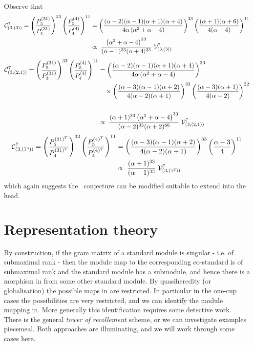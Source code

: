 \documentclass{article}
\newcommand{\ppmm}[1]{#1}  %
\theoremstyle{definition}
\def\a{\alpha}
\numberwithin{equation}{subsection}
\begin{document}
Observe that
\begin{align*}
\CC^{7}_{(3,(3))} = 
\left( \frac{ P^{(31)}_{\ppmm{5}}}{P^{(31)}_{4}} \right)^{33} 
\left( \frac{ P^{(4)}_{\ppmm{5}}}{P^{(4)}_{4}} \right)^{11} 
&=  \left( \frac{(\alpha -2) (\alpha -1) (\alpha +1) (\alpha +4)}{4 \alpha  \left(\alpha ^2+\alpha -4\right)}  \right)^{33} 
\left( \frac{(\alpha +1) (\alpha +6)}{4 (\alpha +4)}\right)^{11} 
\\
&\propto \; \frac{\left(\alpha ^2+\alpha -4\right)^{33}}{(\alpha -1)^{33} (\alpha +4)^{33}} \; \V^7_{(3,(3))}
\end{align*}
\begin{align*}
\CC^{7}_{(3,(2,1))} = 
\left( \frac{ P^{(31)}_{\ppmm{5}}}{P^{(31)}_{3}} \right)^{33} 
\left( \frac{ P^{(4)}_{\ppmm{5}}}{P^{(4)}_{4}} \right)^{11} 
&= \left( \frac{(\alpha -2) (\alpha -1) (\alpha +1) (\alpha +4)}{4 \alpha  \left(\alpha ^2+\alpha -4\right)}  \right)^{33}\\
&\quad \times \left(\frac{(\alpha -3) (\alpha -1) (\alpha +2)}{4 (\alpha -2) (\alpha +1)}\right)^{33}\left(\frac{(\alpha -3) (\alpha +1)}{4 (\alpha -2)}\right)^{22}\\ 
\\
&\propto \; \frac{ (\alpha +1)^{33} \left(\alpha ^2+\alpha -4\right)^{33}}{(\alpha -2)^{33} (\alpha +2)^{66}} \; \V^7_{(3,(2,1))}
\end{align*}
\begin{align*}
\CC^{7}_{(3,(1^3))} = 
\left( \frac{ P^{(31)^T}_{\ppmm{5}}}{P^{(31)^T}_{4}} \right)^{33} 
\left( \frac{ P^{(4)^T}_{\ppmm{5}}}{P^{(4)^T}_{4}} \right)^{11} 
&=  \left( \frac{(\alpha -3) (\alpha -1) (\alpha +2)}{4 (\alpha -2) (\alpha +1)}  \right)^{33} 
\left( \frac{\alpha -3}{4}\right)^{11} 
\\
&\propto \; \frac{(\a+1)^{33}}{(\a-1)^{33}} \; \V^7_{(3,(1^3))}
\end{align*}
which again suggests the \ournotmain\ conjecture can be modified suitable to extend into the head.


\newpage 



\newcommand{\rb}[1]{\raisebox{.685cm}{$\; #1 \;$}}


\section{Representation theory}  \label{ss:repthy}

By construction, if the gram matrix of a standard module is singular - i.e. of submaximal rank - then the module map to the corresponding co-standard is of submaximal rank and the standard module has a submodule, and hence there is a morphism in from some other standard module.
By quasiheredity (or globalisation) \cite{KadarYu} the possible maps in are restricted.
In particular in the one-cup cases the possibilities are very restricted, and we 
can identify the module mapping in. 
More generally this identification requires some detective work. 
There is the general {\em tower of recollement} scheme, or we can investigate examples piecemeal. Both approaches are illuminating, and we will work through some cases here. 
\end{document}
